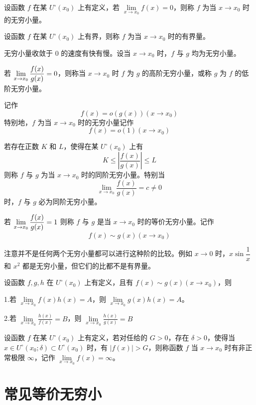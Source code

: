 \begin{definition}[无穷小量]
	设函数 $f$ 在某 $U^\circ(x_0)$ 上有定义，若 $\lim\limits_{x \to x_0}f(x)=0$，则称 $f$ 为当 $x \to x_0$ 时的无穷小量。
\end{definition}

\begin{definition}[有界量]
	设函数 $f$ 在某 $U^\circ(x_0)$ 上有界，则称 $f$ 为当 $x \to x_0$ 时的有界量。
\end{definition}

无穷小量收敛于 $0$ 的速度有快有慢。设当 $x \to x_0$ 时，$f$ 与 $g$ 均为无穷小量。

若 $\lim\limits_{x \to x_0}\mfrac{f(x)}{g(x)} = 0$，则称当 $x \to x_0$ 时 $f$ 为 $g$ 的高阶无穷小量，或称 $g$ 为 $f$ 的低阶无穷小量。

记作
\[ f(x)=o(g(x))(x \to x_0) \]
特别地，$f$ 为当 $x \to x_0$ 时的无穷小量记作
\[ f(x)=o(1)(x \to x_0) \]

若存在正数 $K$ 和 $L$，使得在某 $U^\circ(x_0)$ 上有
\[ K\leqslant \left|\frac{f(x)}{g(x)}\right| \leqslant L \]
则称 $f$ 与 $g$ 为当 $x \to x_0$ 时的同阶无穷小量。特别当
\[ \lim_{x \to x_0}\frac{f(x)}{g(x)} = c \ne 0 \]
时，$f$ 与 $g$ 必为同阶无穷小量。

若 $\lim\limits_{x \to x_0}\mfrac{f(x)}{g(x)} = 1$ 则称 $f$ 与 $g$ 是当 $x \to x_0$ 时的等价无穷小量。记作
\[ f(x) \sim g(x) (x \to x_0) \]

注意并不是任何两个无穷小量都可以进行这种阶的比较。例如 $x \to 0$ 时，$x\sin\dfrac{1}{x}$ 和 $x^2$ 都是无穷小量，但它们的比都不是有界量。

\begin{theorem}
	设函数 $f,g,h$ 在 $U^\circ(x_0)$ 上有定义，且有 $f(x) \sim g(x)(x \to x_0)$，则

	1.若 $\lim\limits_{x \to x_0}f(x)h(x) = A$，则 $\lim\limits_{x \to x_0}g(x)h(x) = A$。

	2.若 $\lim\limits_{x \to x_0}\frac{h(x)}{f(x)}=B$，则 $\lim\limits_{x \to x_0}\frac{h(x)}{g(x)}=B$
\end{theorem}

\begin{definition}[无穷大量]
	设函数 $f$ 在某 $U^\circ(x_0)$ 上有定义，若对任给的 $G>0$，存在 $\delta>0$，使得当 $x\in U^\circ(x_0;\delta)\subset U^\circ(x_0)$ 时，有 $|f(x)|>G$，则称函数 $f$ 当 $x \to x_0$ 时有非正常极限 $\infty$，记作 $\lim\limits_{x \to x_0}f(x) = \infty$。
\end{definition}

\section{常见等价无穷小}

